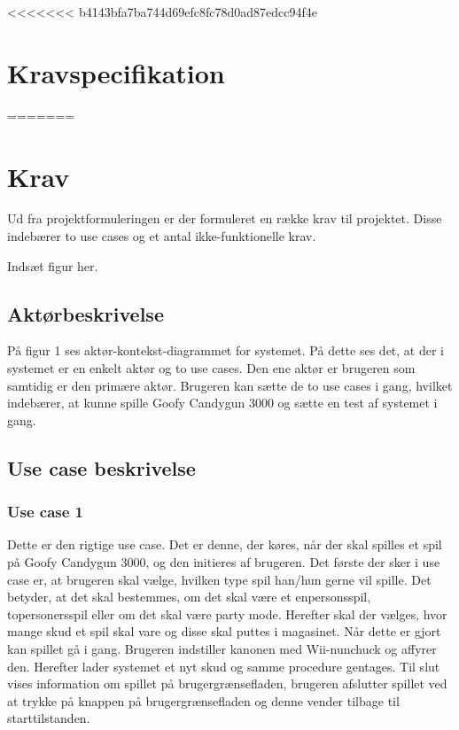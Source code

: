 <<<<<<< b4143bfa7ba744d69efc8fc78d0ad87edcc94f4e
\chapter{Kravspecifikation}
=======
\chapter{Krav}

Ud fra projektformuleringen er der formuleret en række krav til projektet. Disse indebærer to use cases og et antal ikke-funktionelle krav. 


Indsæt figur her. 

%


\section{Aktørbeskrivelse}
På figur 1 ses aktør-kontekst-diagrammet for systemet. På dette ses det, at der i systemet er en enkelt aktør og to use cases. Den ene aktør er brugeren som samtidig er den primære aktør. Brugeren kan sætte de to use cases i gang, hvilket indebærer, at kunne spille Goofy Candygun 3000 og sætte en test af systemet i gang. 

\section{Use case beskrivelse}
\subsection{Use case 1}
Dette er den rigtige use case. Det er denne, der køres, når der skal spilles et spil på Goofy Candygun 3000, og den initieres af brugeren. Det første der sker i use case er, at brugeren skal vælge, hvilken type spil han/hun gerne vil spille. Det betyder, at det skal bestemmes, om det skal være et enpersonsspil, topersonersspil eller om det skal være party mode. Herefter skal der vælges, hvor mange skud et spil skal vare og disse skal puttes i magasinet. Når dette er gjort kan spillet gå i gang. Brugeren indstiller kanonen med Wii-nunchuck og affyrer den. Herefter lader systemet et nyt skud og samme procedure gentages. Til slut vises information om spillet på brugergrænsefladen, brugeren afslutter spillet ved at trykke på knappen på brugergrænsefladen og denne vender tilbage til starttilstanden. 

